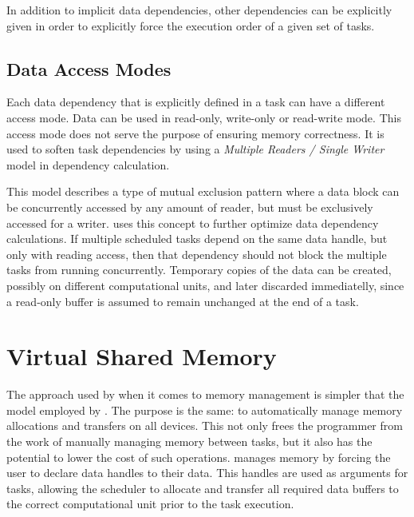 \documentclass[main.tex]{subfiles}
\begin{document}
In addition to implicit data dependencies, other dependencies can be explicitly given in order to explicitly force the execution order of a given set of tasks.

\subsection{Data Access Modes}

Each data dependency that is explicitly defined in a task can have a different access mode. Data can be used in read-only, write-only or read-write mode. This access mode does not serve the purpose of ensuring memory correctness. It is used to soften task dependencies by using a \emph{Multiple Readers / Single Writer} model in dependency calculation.

This model describes a type of mutual exclusion pattern where a data block can be concurrently accessed by any amount of reader, but must be exclusively accessed for a writer. \starpu uses this concept to further optimize data dependency calculations. If multiple scheduled tasks depend on the same data handle, but only with reading access, then that dependency should not block the multiple tasks from running concurrently. Temporary copies of the data can be created, possibly on different computational units, and later discarded immediatelly, since a read-only buffer is assumed to remain unchanged at the end of a task.



\section{Virtual Shared Memory}

The approach used by \starpu when it comes to memory management is simpler that the model employed by \gama. The purpose is the same: to automatically manage memory allocations and transfers on all devices. This not only frees the programmer from the work of manually managing memory between tasks, but it also has the potential to lower the cost of such operations.
\starpu manages memory by forcing the user to declare data handles to their data. This handles are used as arguments for tasks, allowing the scheduler to allocate and transfer all required data buffers to the correct computational unit prior to the task execution.
\end{document}
